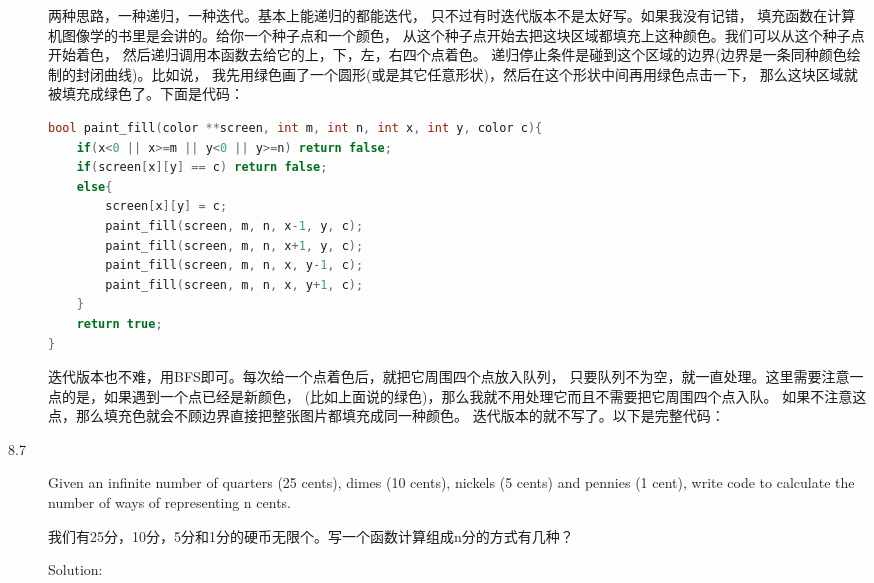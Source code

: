 \begin{description}
两种思路，一种递归，一种迭代。基本上能递归的都能迭代， 只不过有时迭代版本不是太好写。如果我没有记错， 填充函数在计算机图像学的书里是会讲的。给你一个种子点和一个颜色， 从这个种子点开始去把这块区域都填充上这种颜色。我们可以从这个种子点开始着色， 然后递归调用本函数去给它的上，下，左，右四个点着色。 递归停止条件是碰到这个区域的边界(边界是一条同种颜色绘制的封闭曲线)。比如说， 我先用绿色画了一个圆形(或是其它任意形状)，然后在这个形状中间再用绿色点击一下， 那么这块区域就被填充成绿色了。下面是代码：
\begin{lstlisting}[language=C++]
bool paint_fill(color **screen, int m, int n, int x, int y, color c){
    if(x<0 || x>=m || y<0 || y>=n) return false;
    if(screen[x][y] == c) return false;
    else{
        screen[x][y] = c;
        paint_fill(screen, m, n, x-1, y, c);
        paint_fill(screen, m, n, x+1, y, c);
        paint_fill(screen, m, n, x, y-1, c);
        paint_fill(screen, m, n, x, y+1, c);
    }
    return true;
}
\end{lstlisting}
迭代版本也不难，用BFS即可。每次给一个点着色后，就把它周围四个点放入队列， 只要队列不为空，就一直处理。这里需要注意一点的是，如果遇到一个点已经是新颜色， (比如上面说的绿色)，那么我就不用处理它而且不需要把它周围四个点入队。 如果不注意这点，那么填充色就会不顾边界直接把整张图片都填充成同一种颜色。 迭代版本的就不写了。以下是完整代码：



\item[8.7] Given an infinite number of quarters (25 cents), dimes (10 cents), nickels (5 cents) and pennies (1 cent), write code to calculate the number of ways of representing n cents.

我们有25分，10分，5分和1分的硬币无限个。写一个函数计算组成n分的方式有几种？

Solution: 


\end{description}
